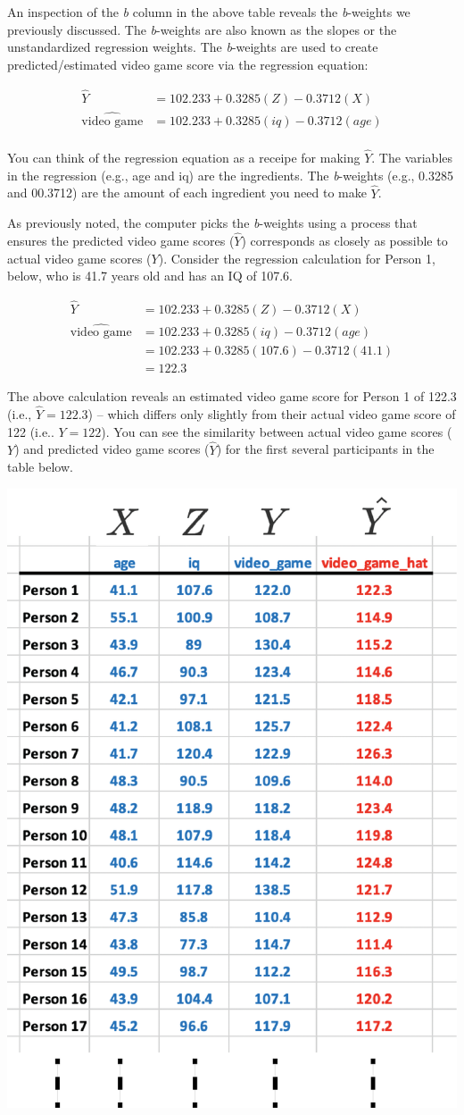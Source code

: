 \documentclass[
]{krantz}
\begin{document}
An inspection of the \emph{b} column in the above table reveals the \emph{b}-weights we previously discussed. The \emph{b}-weights are also known as the slopes or the unstandardized regression weights. The \emph{b}-weights are used to create predicted/estimated video game score via the regression equation:

\[
\begin{aligned}
\widehat{Y} &= 102.233 + 0.3285(Z) - 0.3712(X) \\
\widehat{\text{video game}} &= 102.233 + 0.3285(iq) - 0.3712(age) \\
\end{aligned}
\]

You can think of the regression equation as a receipe for making \(\hat{Y}\). The variables in the regression (e.g., age and iq) are the ingredients. The \emph{b}-weights (e.g., 0.3285 and 00.3712) are the amount of each ingredient you need to make \(\hat{Y}\).

As previously noted, the computer picks the \emph{b}-weights using a process that ensures the predicted video game scores (\(\hat{Y}\)) corresponds as closely as possible to actual video game scores (\(Y\)). Consider the regression calculation for Person 1, below, who is 41.7 years old and has an IQ of 107.6.

\[
\begin{aligned}
\widehat{Y} &= 102.233 + 0.3285(Z) - 0.3712(X) \\
\widehat{\text{video game}} &= 102.233 + 0.3285(iq) - 0.3712(age) \\
&= 102.233 + 0.3285(107.6) - 0.3712(41.1) \\
&= 122.3
\end{aligned}
\]

The above calculation reveals an estimated video game score for Person 1 of 122.3 (i.e., \(\hat{Y} = 122.3\)) -- which differs only slightly from their actual video game score of 122 (i.e.. \(Y = 122\)). You can see the similarity between actual video game scores (\(Y\)) and predicted video game scores (\(\hat{Y}\)) for the first several participants in the table below.

\includegraphics[width=0.5\linewidth]{ch_multiple_regression/images/mr_reg_data_figure}
\end{document}
